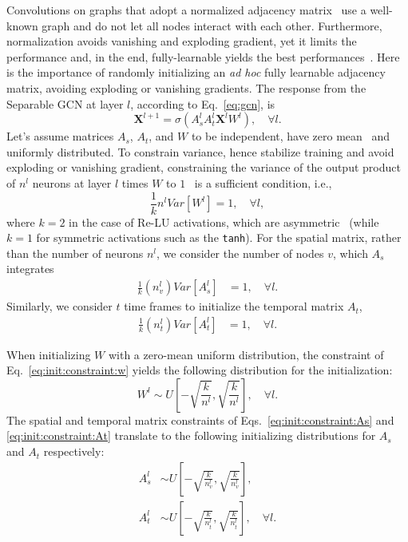 \documentclass[10pt,twocolumn,letterpaper]{article}
\begin{document}
Convolutions on graphs that adopt a normalized adjacency matrix~\cite{kipf17, tong20} use a well-known graph and do not let all nodes interact with each other.
Furthermore, normalization avoids vanishing and exploding gradient, yet it limits the performance and, in the end, fully-learnable yields the best performances~\cite{sofianos21, sampieri22}.
Here is the importance of randomly initializing an \textit{ad hoc} fully learnable adjacency matrix, avoiding exploding or vanishing gradients.
The response from the Separable GCN at layer $l$, according to Eq.~\eqref{eq:gcn}, is
\begin{equation}
    \label{eq:gcn:l}
    \mathbf{X}^{l+1} = \sigma \left( A_s^l A_t^l \mathbf{X}^l W^l \right), \quad \forall l.
\end{equation}
Let's assume matrices $A_s$, $A_t$, and $W$ to be independent, have zero mean~\cite{glorot10, he15} and uniformly distributed.
To constrain variance, hence stabilize training and avoid exploding or vanishing gradient, constraining the variance of the output product of $n^l$ neurons at layer $l$ times $W$ to $1$~\cite{he15} is a sufficient condition, i.e.,
\begin{equation}
    \label{eq:init:constraint:w}
    \frac{1}{k} n^l Var[W^l] = 1, \quad \forall l,
\end{equation}
where $k = 2$ in the case of Re-LU activations, which are asymmetric~\cite{he15} (while $k=1$ for symmetric activations such as the \texttt{tanh}).
For the spatial matrix, rather than the number of neurons $n^l$, we consider the number of nodes $v$, which $A_s$ integrates
\begin{align}
    \label{eq:init:constraint:As}
    \frac{1}{k}(n_v^l) Var[A_s^l] &= 1, \quad \forall l.
\end{align}
Similarly, we consider $t$ time frames to initialize the temporal matrix $A_t$,
\begin{align}
    \label{eq:init:constraint:At}
    \frac{1}{k}(n_t^l) Var[A_t^l] &= 1, \quad \forall l.
\end{align}

When initializing $W$ with a zero-mean uniform distribution, the constraint of Eq.~\eqref{eq:init:constraint:w} yields the following distribution for the initialization:
\begin{equation}
    \label{eq:init:W}
    W^l \sim U \left[ - \sqrt{\frac{k}{n^l}}, \sqrt{\frac{k}{n^l}} \right], \quad \forall l.
\end{equation}
The spatial and temporal matrix constraints of Eqs.~\eqref{eq:init:constraint:As} and \eqref{eq:init:constraint:At} translate to the following initializing distributions for $A_s$ and $A_t$ respectively:
\begin{align}
    \label{eq:init:As}
    A_s^l &\sim U \left[ - \sqrt{\frac{k}{n_v^l}}, \sqrt{\frac{k}{n_v^l}} \right], \\
    \label{eq:init:At}
    A_t^l &\sim U \left[ - \sqrt{\frac{k}{n_t^l}}, \sqrt{\frac{k}{n_t^l}} \right], \quad \forall l.
\end{align}
\end{document}
